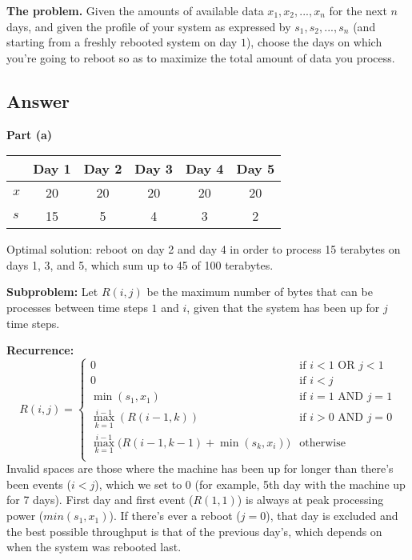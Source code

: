 \documentclass[12pt, letterpaper]{article}
\newcommand{\grayrow}{\rowcolor[gray]{.8}}
\begin{document}
\noindent\textbf{The problem.} Given the amounts of available data $x_1, x_2, ... , x_n$ for the next $n$ days, and given the profile of your system as expressed by $s_1, s_2, ... , s_n$ (and starting from a freshly rebooted system on day $1$), choose the days on which you're going to reboot so as to maximize the total amount of data you process.

\subsection*{Answer}

\vspace{5mm}
\noindent\textbf{Part (a)}
\begin{table}[h!]
    \centering
    \begin{tabular}{lccccc}
        \hline
        \grayrow        & \textbf{Day 1} & \textbf{Day 2} & \textbf{Day 3} & \textbf{Day 4} & \textbf{Day 5} \\
        \hline
        $x$         & 20 & 20 & 20 & 20 & 20 \\
        $s$         & 15 &  5 &  4 &  3 &  2 \\
        \hline
    \end{tabular}
\end{table}
Optimal solution: reboot on day 2 and day 4 in order to process 15 terabytes on days 1, 3, and 5, which sum up to 45 of 100 terabytes.

\vspace{5mm}
\noindent\textbf{Subproblem:}
Let $R(i, j)$ be the maximum number of bytes that can be processes between time steps $1$ and $i$, given that the system has been up for $j$ time steps.

\vspace{5mm}
\noindent\textbf{Recurrence:}
\begin{equation*}
    R(i, j) = 
    \begin{cases}
    0 & \text{if } i < 1 \text{ OR } j < 1 \\
    0 & \text{if } i < j \\
    \min(s_1, x_1) & \text{if } i = 1 \text{ AND } j = 1 \\
    \max\limits_{k=1}^{i-1} (R(i-1, k)) & \text{if } i > 0 \text{ AND } j = 0 \\
    \max\limits_{k=1}^{i-1} \big( R(i-1, k-1) + \min(s_k, x_i) \big) & \text{otherwise } \\
    \end{cases}
\end{equation*}
Invalid spaces are those where the machine has been up for longer than there's been events ($i < j$), which we set to $0$ (for example, 5th day with the machine up for 7 days).
First day and first event ($R(1, 1)$) is always at peak processing power ($min(s_1, x_1)$).
If there's ever a reboot ($j=0$), that day is excluded and the best possible throughput is that of the previous day's, which depends on when the system was rebooted last.
\end{document}
